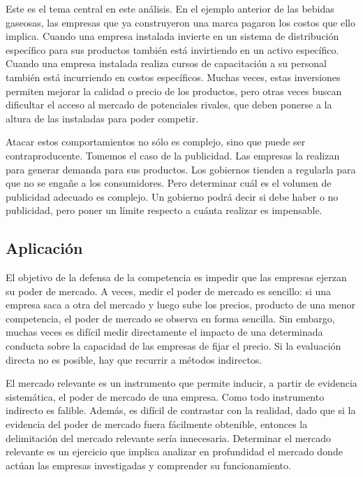 \documentclass[
  12pt,
  spanish,
]{book}
\begin{document}
Este es el tema central en este análisis. En el ejemplo anterior de las bebidas gaseosas, las empresas que ya construyeron una marca pagaron los costos que ello implica. Cuando una empresa instalada invierte en un sistema de distribución específico para sus productos también está invirtiendo en un activo específico. Cuando una empresa instalada realiza cursos de capacitación a su personal también está incurriendo en costos específicos. Muchas veces, estas inversiones permiten mejorar la calidad o precio de los productos, pero otras veces buscan dificultar el acceso al mercado de potenciales rivales, que deben ponerse a la altura de las instaladas para poder competir.

Atacar estos comportamientos no sólo es complejo, sino que puede ser contraproducente. Tomemos el caso de la publicidad. Las empresas la realizan para generar demanda para sus productos. Los gobiernos tienden a regularla para que no se engañe a los consumidores. Pero determinar cuál es el volumen de publicidad adecuado es complejo. Un
gobierno podrá decir si debe haber o no publicidad, pero poner un límite respecto a cuánta realizar es impensable.

\hypertarget{aplicaciuxf3n}{%
\subsection{Aplicación}\label{aplicaciuxf3n}}

El objetivo de la defensa de la competencia es impedir que las empresas ejerzan su poder de mercado. A veces, medir el poder de mercado es sencillo: si una empresa saca a otra del mercado y luego sube los precios, producto de una menor competencia, el poder de mercado se observa en forma sencilla. Sin embargo, muchas veces es difícil medir directamente el impacto de una determinada conducta sobre la capacidad de las empresas de fijar el precio. Si la evaluación directa no es posible, hay que recurrir a métodos indirectos.

El mercado relevante es un instrumento que permite inducir, a partir de evidencia sistemática, el poder de mercado de una empresa. Como todo instrumento indirecto es falible. Además, es difícil de contrastar con la realidad, dado que si la evidencia del poder de mercado fuera fácilmente obtenible, entonces la delimitación del mercado relevante sería innecesaria. Determinar el mercado relevante es un ejercicio que implica analizar en profundidad el mercado donde actúan las empresas investigadas y comprender su funcionamiento.
\end{document}
